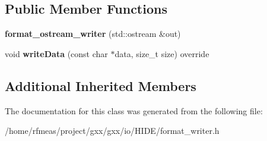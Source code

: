 \subsection*{Public Member Functions}
\begin{DoxyCompactItemize}
\item 
{\bfseries format\+\_\+ostream\+\_\+writer} (std\+::ostream \&out)\hypertarget{classgxx_1_1io_1_1format__ostream__writer_ac5100bd5712f71301506b1cfc3b4a36e}{}\label{classgxx_1_1io_1_1format__ostream__writer_ac5100bd5712f71301506b1cfc3b4a36e}

\item 
void {\bfseries write\+Data} (const char $\ast$data, size\+\_\+t size) override\hypertarget{classgxx_1_1io_1_1format__ostream__writer_a7cb7009b2a7c6ab2e9e45f28b1262dec}{}\label{classgxx_1_1io_1_1format__ostream__writer_a7cb7009b2a7c6ab2e9e45f28b1262dec}

\end{DoxyCompactItemize}
\subsection*{Additional Inherited Members}


The documentation for this class was generated from the following file\+:\begin{DoxyCompactItemize}
\item 
/home/rfmeas/project/gxx/gxx/io/\+H\+I\+D\+E/format\+\_\+writer.\+h\end{DoxyCompactItemize}
